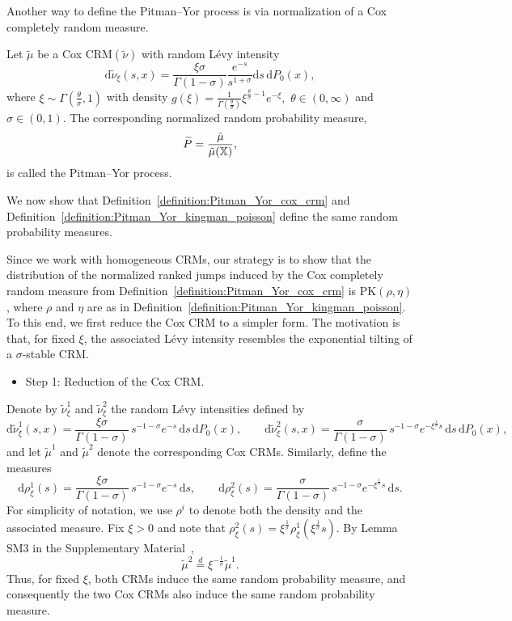 Another way to define the Pitman--Yor process is via normalization of a Cox completely random measure.

\begin{definition}\label{definition:Pitman_Yor_cox_crm}
Let $\tilde{\mu}$ be a Cox $\mathrm{CRM}(\tilde{\nu})$ with random L\'evy intensity
\[
\mathrm{d}\tilde{\nu}_\xi(s,x) = \frac{\xi \sigma}{\Gamma(1-\sigma)}\frac{e^{-s}}{s^{1+\sigma}}\mathrm{d}s\,\mathrm{d}P_0(x),
\]
where $\xi\sim \Gamma\left( \frac{\theta}{\sigma}, 1\right)$ with density
$
g(\xi) = \frac{1}{\Gamma\left(\frac{\theta}{\sigma}\right)} \xi^{\frac{\theta}{\sigma}-1}e^{-\xi},
$
$\theta \in (0, \infty)$ and $\sigma \in (0,1)$.
The corresponding normalized random probability measure,
\[
\widetilde{P} = \frac{\tilde{\mu}}{\tilde{\mu}(\mathbb{X})},
\]
is called the Pitman--Yor process.
\end{definition}

We now show that Definition~\ref{definition:Pitman_Yor_cox_crm} and Definition~\ref{definition:Pitman_Yor_kingman_poisson} define the same random probability measures.

Since we work with homogeneous CRMs, our strategy is to show that the distribution of the normalized ranked jumps induced by the Cox completely random measure from Definition~\ref{definition:Pitman_Yor_cox_crm} is $\mathrm{PK}(\rho, \eta)$, where $\rho$ and $\eta$ are as in Definition~\ref{definition:Pitman_Yor_kingman_poisson}. To this end, we first reduce the Cox CRM to a simpler form. The motivation is that, for fixed $\xi$, the associated L\'evy intensity resembles the exponential tilting of a $\sigma$-stable CRM.

\begin{itemize}
    \item Step 1: Reduction of the Cox CRM.
\end{itemize}

Denote by $\tilde{\nu}_{\xi}^1$ and $\tilde{\nu}_{\xi}^2$ the random L\'evy intensities defined by
\[
\mathrm{d}\tilde{\nu}_{\xi}^1(s,x) = \frac{\xi \sigma}{\Gamma(1-\sigma)}\,s^{-1-\sigma}e^{-s}\,\mathrm{d}s\, \mathrm{d}P_0(x), \qquad
\mathrm{d}\tilde{\nu}_{\xi}^2(s,x) = \frac{\sigma}{\Gamma(1-\sigma)}\,s^{-1-\sigma}e^{-\xi^{\frac{1}{\sigma}}s}\,\mathrm{d}s\, \mathrm{d}P_0(x),
\]
and let $\tilde{\mu}^1$ and $\tilde{\mu}^2$ denote the corresponding Cox CRMs. Similarly, define the measures
\[
\mathrm{d}\rho_\xi^1(s) = \frac{\xi \sigma}{\Gamma(1-\sigma)}\,s^{-1-\sigma}e^{-s}\,\mathrm{d}s, \qquad
\mathrm{d}\rho_\xi^2(s) = \frac{\sigma}{\Gamma(1-\sigma)}\,s^{-1-\sigma}e^{-\xi^{\frac{1}{\sigma}}s}\,\mathrm{d}s.
\]
For simplicity of notation, we use $\rho^i$ to denote both the density and the associated measure. Fix $\xi > 0$ and note that $\rho^2_\xi(s) = \xi^{\frac{1}{\sigma}}\rho_\xi^1(\xi^{\frac{1}{\sigma}}s)$. By Lemma SM3 in the Supplementary Material~\cite{catalano2026merging},
\[
\tilde{\mu}^2 \overset{d}{=} \xi^{-\frac{1}{\sigma}}\tilde{\mu}^1.
\]
Thus, for fixed $\xi$, both CRMs induce the same random probability measure, and consequently the two Cox CRMs also induce the same random probability measure.

